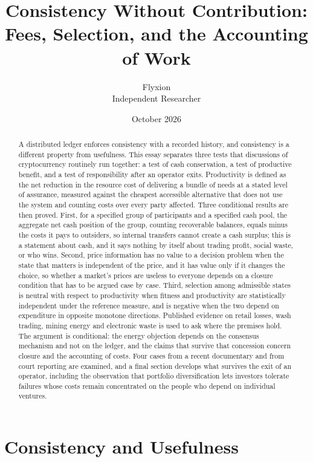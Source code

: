 \documentclass[11pt]{article}
\title{Consistency Without Contribution:\\Fees, Selection, and the Accounting of Work}
\author{Flyxion\\Independent Researcher}
\date{October 2026}
\theoremstyle{remark}
\begin{document}
\maketitle

\begin{abstract}
\noindent A distributed ledger enforces consistency with a recorded history, and consistency is a different property from usefulness. This essay separates three tests that discussions of cryptocurrency routinely run together: a test of cash conservation, a test of productive benefit, and a test of responsibility after an operator exits. Productivity is defined as the net reduction in the resource cost of delivering a bundle of needs at a stated level of assurance, measured against the cheapest accessible alternative that does not use the system and counting costs over every party affected. Three conditional results are then proved. First, for a specified group of participants and a specified cash pool, the aggregate net cash position of the group, counting recoverable balances, equals minus the costs it pays to outsiders, so internal transfers cannot create a cash surplus; this is a statement about cash, and it says nothing by itself about trading profit, social waste, or who wins. Second, price information has no value to a decision problem when the state that matters is independent of the price, and it has value only if it changes the choice, so whether a market's prices are useless to everyone depends on a closure condition that has to be argued case by case. Third, selection among admissible states is neutral with respect to productivity when fitness and productivity are statistically independent under the reference measure, and is negative when the two depend on expenditure in opposite monotone directions. Published evidence on retail losses, wash trading, mining energy and electronic waste is used to ask where the premises hold. The argument is conditional: the energy objection depends on the consensus mechanism and not on the ledger, and the claims that survive that concession concern closure and the accounting of costs. Four cases from a recent documentary and from court reporting are examined, and a final section develops what survives the exit of an operator, including the observation that portfolio diversification lets investors tolerate failures whose costs remain concentrated on the people who depend on individual ventures.
\end{abstract}

\newpage

\section{Consistency and Usefulness}\label{sec:intro}
\end{document}

